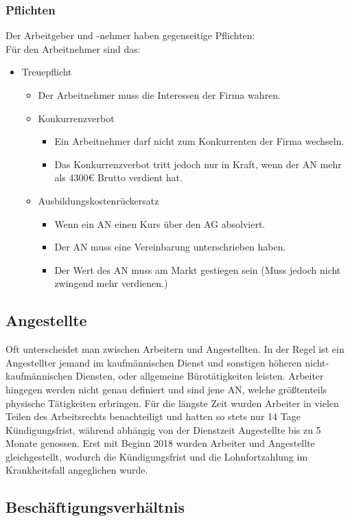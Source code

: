 \documentclass{article}
\begin{document}
	\subsubsection{Pflichten}
	Der Arbeitgeber und -nehmer haben gegenseitige Pflichten: \\
	Für den Arbeitnehmer sind das:
	\begin{itemize}
		\item{Treuepflicht}
		\begin{itemize}
			\item{Der Arbeitnehmer muss die Interessen der Firma wahren.}
			\item{Konkurrenzverbot}
			\begin{itemize}
			\item{Ein Arbeitnehmer darf nicht zum Konkurrenten der Firma wechseln.}
			\item{Das Konkurrenzverbot tritt jedoch nur in Kraft, wenn der AN mehr als 4300€ Brutto verdient hat.}
			\end{itemize}
			\item{Ausbildungskostenrückersatz}
			\begin{itemize}
				\item{Wenn ein AN einen Kurs über den AG absolviert.}
				\item{Der AN muss eine Vereinbarung unterschrieben haben.}
				\item{Der Wert des AN muss am Markt gestiegen sein (Muss jedoch nicht zwingend mehr verdienen.)}
			\end{itemize}
		\end{itemize}
	\end{itemize}
	\subsection{Angestellte}
	Oft unterscheidet man zwischen Arbeitern und Angestellten. In der Regel ist ein Angestellter jemand im kaufmännischen Dienst und sonstigen höheren nicht-kaufmännischen Diensten, oder allgemeine Bürotätigkeiten leisten. Arbeiter hingegen werden nicht genau definiert und sind jene AN, welche größtenteils physische Tätigkeiten erbringen. Für die längste Zeit wurden Arbeiter in vielen Teilen des Arbeitsrechts benachteiligt und hatten so stets nur 14 Tage Kündigungsfrist, während abhängig von der Dienstzeit Angestellte bis zu 5 Monate genossen. Erst mit Beginn 2018 wurden Arbeiter und Angestellte gleichgestellt, wodurch die Kündigungsfrist und die Lohnfortzahlung im Krankheitsfall angeglichen wurde. 
	\subsection{Beschäftigungsverhältnis}
\end{document}
